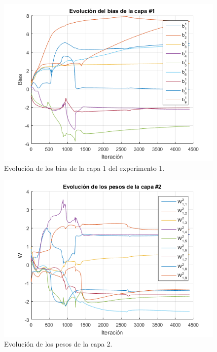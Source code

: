 \begin{figure}[H]
    \begin{center}
        \includegraphics[width=12cm]{1/bias1.png}
        \caption{Evolución de los bias de la capa 1 del experimento 1.}
        \label{fig:bias1}
    \end{center}
\end{figure}
\begin{figure}[H]
    \begin{center}
        \includegraphics[width=13cm]{1/pesos2.png}
        \caption{Evolución de los pesos de la capa 2.}
        \label{fig:pesos2}
    \end{center}
\end{figure}

